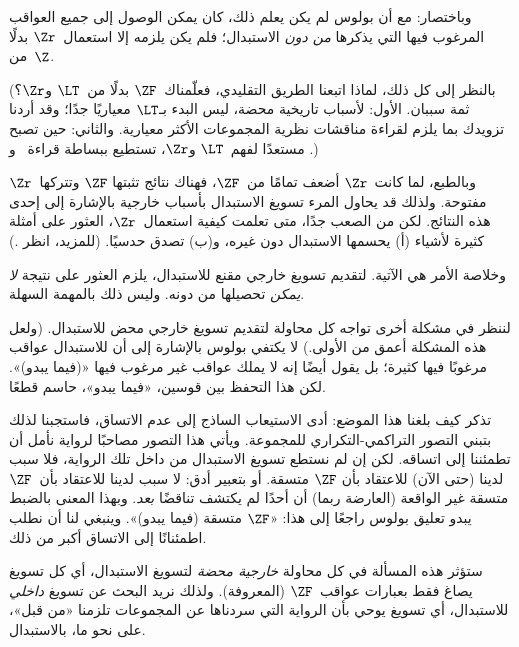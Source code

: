 \documentclass[../../../include/open-logic-section]{subfiles}
\begin{document}
وباختصار: مع أن بولوس لم يكن يعلم ذلك، كان يمكن الوصول إلى جميع
العواقب المرغوب فيها التي يذكرها \emph{من دون} الاستبدال؛ فلم يكن
يلزمه إلا استعمال~$\Zr$ بدلًا من~$\Z$.

(بالنظر إلى كل ذلك، لماذا اتبعنا الطريق التقليدي، فعلّمناك~$\ZF$
بدلًا من~$\LT$ و$\Zr$؟ ثمة سببان. الأول: لأسباب تاريخية محضة، ليس
البدء بـ$\LT$ معياريًا جدًا؛ وقد أردنا تزويدك بما يلزم لقراءة مناقشات
نظرية المجموعات الأكثر معيارية. والثاني: حين تصبح مستعدًا لفهم~$\LT$
و$\Zr$، تستطيع ببساطة قراءة~\citealt{Potter2004} و
\citealt{ButtonLT1}.)

وبالطبع، لما كانت~$\Zr$ أضعف تمامًا من~$\ZF$، فهناك نتائج تثبتها
$\ZF$ وتتركها~$\Zr$ مفتوحة. ولذلك قد يحاول المرء تسويغ الاستبدال
بأسباب خارجية بالإشارة إلى إحدى هذه النتائج. لكن من الصعب جدًا، متى
تعلمت كيفية استعمال~$\Zr$، العثور على أمثلة كثيرة لأشياء (أ) يحسمها
الاستبدال دون غيره، و(ب) تصدق حدسيًا. (للمزيد، انظر
\citealt[\S13.2]{Potter2004}.)

وخلاصة الأمر هي الآتية. لتقديم تسويغ خارجي مقنع للاستبدال، يلزم العثور
على نتيجة \emph{لا يمكن} تحصيلها من دونه. وليس ذلك بالمهمة السهلة.

لننظر في مشكلة أخرى تواجه كل محاولة لتقديم تسويغ خارجي محض للاستبدال.
(ولعل هذه المشكلة أعمق من الأولى.) لا يكتفي بولوس بالإشارة إلى أن
للاستبدال عواقب مرغوبًا فيها كثيرة؛ بل يقول أيضًا إنه لا يملك عواقب
غير مرغوب فيها «(فيما يبدو)». لكن هذا التحفظ بين قوسين، «فيما يبدو»،
حاسم قطعًا.

تذكر كيف بلغنا هذا الموضع: أدى الاستيعاب الساذج إلى عدم الاتساق،
فاستجبنا لذلك بتبني التصور التراكمي-التكراري للمجموعة. ويأتي هذا التصور
مصاحبًا لرواية نأمل أن تطمئننا إلى اتساقه. لكن إن لم نستطع تسويغ
الاستبدال من داخل تلك الرواية، فلا سبب لدينا (حتى الآن) للاعتقاد بأن
$\ZF$ متسقة. أو بتعبير أدق: لا سبب لدينا للاعتقاد بأن~$\ZF$ متسقة
غير الواقعة (العارضة ربما) أن أحدًا لم يكتشف تناقضًا \emph{بعد}. وبهذا
المعنى بالضبط يبدو تعليق بولوس راجعًا إلى هذا: «$\ZF$ متسقة (فيما
يبدو)». وينبغي لنا أن نطلب اطمئنانًا إلى الاتساق أكبر من ذلك.

ستؤثر هذه المسألة في كل محاولة \emph{خارجية محضة} لتسويغ الاستبدال،
أي كل تسويغ يصاغ فقط بعبارات عواقب~$\ZF$ (المعروفة). ولذلك نريد البحث
عن تسويغ \emph{داخلي} للاستبدال، أي تسويغ يوحي بأن الرواية التي
سردناها عن المجموعات تلزمنا «من قبل»، على نحو ما، بالاستبدال.
\end{document}
